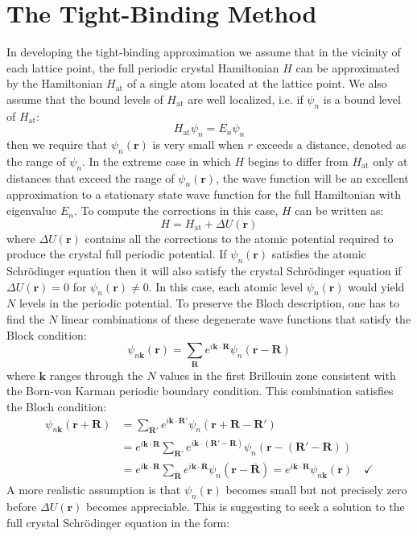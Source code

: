\documentclass[10.75pt,a4paper,openright,bottom=2cm]{article}
\renewcommand{\Vec}[1]{\boldsymbol{#1}}
\begin{document}
\section{The Tight-Binding Method}
In developing the tight-binding approximation we assume that in the vicinity of each lattice point, the full periodic crystal Hamiltonian $H$ can be approximated by the Hamiltonian $H_{\text{at}}$ of a single atom located at the lattice point. We also assume that the bound levels of $H_{\text{at}}$ are well localized, i.e. if $\psi_n$ is a bound level of $H_{\text{at}}$:
\[
H_{\text{at}}\psi_n=E_n\psi_n
\]
then we require that $\psi_n(\Vec{r})$ is very small when $r$ exceeds a distance, denoted as the range of $\psi_n$. In the extreme case in which $H$ begins to differ from $H_{\text{at}}$ only at distances that exceed the range of $\psi_n(\Vec{r})$, the wave function will be an excellent approximation to a stationary state wave function for the full Hamiltonian with eigenvalue $E_n$. To compute the corrections in this case, $H$ can be written as:
\[
H=H_{\text{at}}+\Delta U(\Vec{r})
\]
where $\Delta U(\Vec{r})$ contains all the corrections to the atomic potential required to produce the crystal full periodic potential. If $\psi_n(\Vec{r})$ satisfies the atomic Schr\"odinger equation then it will also satisfy the crystal Schr\"odinger equation if $\Delta U(\Vec{r})=0$ for $\psi_n(\Vec{r})\neq0$. In this case, each atomic level $\psi_n(\Vec{r})$ would yield $N$ levels in the periodic potential. To preserve the Bloch description, one has to find the $N$ linear combinations of these degenerate wave functions that satisfy the Block condition:
\[
\psi_{n\Vec{k}}(\Vec{r})=\sum_{\Vec{R}}e^{i\Vec{k}\cdot\Vec{R}}\psi_n(\Vec{r}-\Vec{R})
\]
where $\Vec{k}$ ranges through the $N$ values in the first Brillouin zone consistent with the Born-von Karman periodic boundary condition. This combination satisfies the Bloch condition:
\begin{align*}
\psi_{n\Vec{k}}(\Vec{r}+\Vec{R})&=\sum_{\Vec{R'}}e^{i\Vec{k}\cdot\Vec{R'}}\psi_n(\Vec{r}+\Vec{R}-\Vec{R'})\\
&=e^{i\Vec{k}\cdot\Vec{R}}\sum_{\Vec{R'}}e^{i\Vec{k}\cdot(\Vec{R'}-\Vec{R})}\psi_n(\Vec{r}-(\Vec{R'}-\Vec{R}))\\
&=e^{i\Vec{k}\cdot\Vec{R}}\sum_{\Vec{\overline{R}}}e^{i\Vec{k}\cdot\Vec{\overline{R}}}\psi_n(\Vec{r}-\Vec{\overline{R}})=e^{i\Vec{k}\cdot\Vec{R}}\psi_{n\Vec{k}}(\Vec{r}) \quad \checkmark
\end{align*}
A more realistic assumption is that $\psi_n(\Vec{r})$ becomes small but not precisely zero before $\Delta U(\Vec{r})$ becomes appreciable. This is suggesting to seek a solution to the full crystal Schr\"odinger equation in the form:
\end{document}
